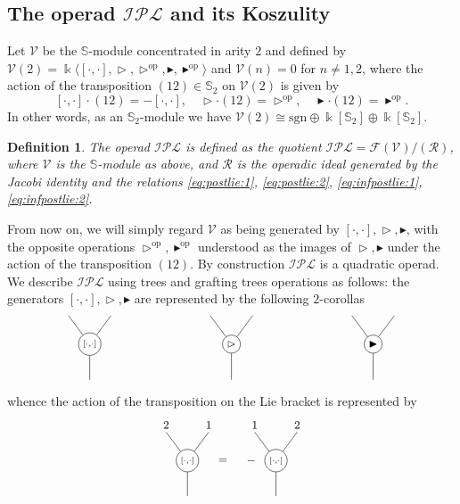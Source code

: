 \documentclass[10pt]{article}
\newtheorem {definition}[lemma] {Definition}
\theoremstyle{definition}
\newcommand{\wt}{\vartriangleright}
\newcommand{\bt}{\blacktriangleright}
\begin{document}
\subsection{The operad $\mathcal{IPL}$ and its Koszulity}
Let $\mathcal{V}$ be the $\mathbb S$-module concentrated in arity $2$ and defined by $\mathcal{V}(2)= \Bbbk \langle [\cdot,\cdot],\wt,\wt^{\mathrm{op}},\bt, \bt^{\mathrm{op}}\rangle$ and $\mathcal{V}(n)=0$ for $n\neq 1,2$, where the action of the transposition $(12)\in\mathbb S_2$ on $\mathcal{V}(2)$ is given by
\[
[\cdot,\cdot] \cdot (12)=-[\cdot,\cdot],
\quad
\wt \cdot (12)=\wt^{\mathrm{op}},
\quad
\bt \cdot (12)=\bt^{\mathrm{op}}.
\]
In other words, as an $\mathbb{S}_2$-module we have $\mathcal{V}(2) \cong \mathrm{sgn} \oplus \Bbbk[\mathbb{S}_2] \oplus \Bbbk[\mathbb{S}_2]$.
\begin{definition}
The operad $\mathcal{IPL}$ is defined as the quotient $\mathcal{IPL} = \mathcal{F}(\mathcal{V})/(\mathcal{R})$, where $\mathcal{V}$ is the $\mathbb{S}$-module as above, and $\mathcal{R}$ is the operadic ideal generated by the Jacobi identity and the relations \eqref{eq:postlie:1}, \eqref{eq:postlie:2}, \eqref{eq:infpostlie:1}, \eqref{eq:infpostlie:2}.
\end{definition}
From now on, we will simply regard $\mathcal{V}$ as being generated by $[\cdot,\cdot], \wt, \bt$, with the opposite operations $\wt^\mathrm{op}, \bt^{\mathrm{op}}$ understood as the images of $\wt,\bt$ under the action of the transposition $(12)$. By construction $\mathcal{IPL}$ is a quadratic operad. We describe $\mathcal{IPL}$ using trees and grafting trees operations as follows: the generators $[\cdot,\cdot],\wt,\bt$ are represented by the following $2$-corollas
\[
\small
\begin{tikzpicture}[scale=1]

\node[circle,draw,inner sep=2pt] (b) at (0,0) {${\scriptstyle[\cdot,\cdot]}$};
\draw (-0.6,0.8)--(b);
\draw (0.6,0.8)--(b);
\draw (b)--(0,-1);

\node[circle,draw,inner sep=2pt] (w) at (4,0) {$\wt$};
\draw (3.4,0.8)--(w);
\draw (4.6,0.8)--(w);
\draw (w)--(4,-1);

\node[circle,draw,inner sep=2pt] (k) at (8,0) {$\bt$};
\draw (7.4,0.8)--(k);
\draw (8.6,0.8)--(k);
\draw (k)--(8,-1);

\end{tikzpicture}
\]
whence the action of the transposition on the Lie bracket is represented by 
\[
\small
\begin{tikzpicture}[scale=1]

\node[circle,draw,inner sep=2pt] (b) at (0,0) {${\scriptstyle[\cdot,\cdot]}$};
\draw (-0.6,0.8)--(b);
\draw (0.6,0.8)--(b);
\draw (b)--(0,-1);
\node at (-0.6,1) {$2$};
\node at (0.6,1) {$1$};
\node at (1,0) {$=$};
\node at (1.8,0) {$-$};
\begin{scope}[shift={(2.5,0)}]
\node[circle,draw,inner sep=2pt] (b) at (0,0) {${\scriptstyle[\cdot,\cdot]}$};
\draw (-0.6,0.8)--(b);
\draw (0.6,0.8)--(b);
\draw (b)--(0,-1);
\node at (-0.6,1) {$1$};
\node at (0.6,1) {$2$};
\end{scope}

\end{tikzpicture}
\]
\end{document}
